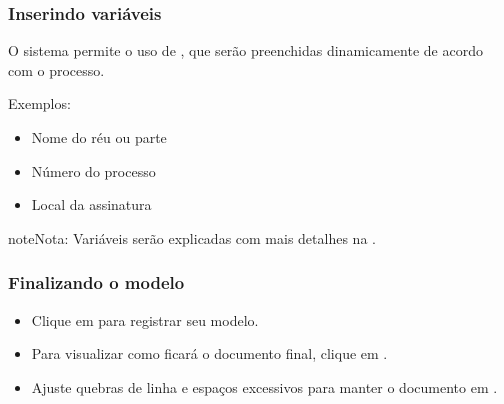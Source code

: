 \documentclass[letterpaper,10pt,brazil]{sphinxmanual}
\begin{document}
\subsubsection{Inserindo variáveis}
\label{\detokenize{projud_48_criandomodelo:inserindo-variaveis}}
\sphinxAtStartPar
O sistema permite o uso de , que serão preenchidas dinamicamente de acordo com o processo.

\sphinxAtStartPar
Exemplos:
\begin{itemize}
\item {} 
\sphinxAtStartPar
{} \textendash{} Nome do réu ou parte

\item {} 
\sphinxAtStartPar
{} \textendash{} Número do processo

\item {} 
\sphinxAtStartPar
{} \textendash{} Local da assinatura

\end{itemize}

\begin{sphinxadmonition}{note}{Nota:}
\sphinxAtStartPar
Variáveis serão explicadas com mais detalhes na .
\end{sphinxadmonition}


\subsubsection{Finalizando o modelo}
\label{\detokenize{projud_48_criandomodelo:finalizando-o-modelo}}\begin{itemize}
\item {} 
\sphinxAtStartPar
Clique em  para registrar seu modelo.

\item {} 
\sphinxAtStartPar
Para visualizar como ficará o documento final, clique em .

\item {} 
\sphinxAtStartPar
Ajuste quebras de linha e espaços excessivos para manter o documento em .

\end{itemize}
\end{document}
